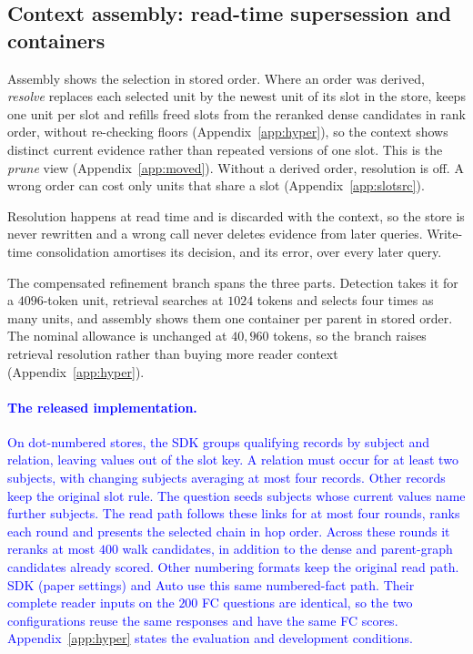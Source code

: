 \documentclass{article}
\newcommand{\nativechange}[1]{\textcolor{blue}{#1}}
\begin{document}
\subsection{Context assembly: read-time supersession and containers}\label{sec:resolve}

Assembly shows the selection in stored order. Where an order was derived, \emph{resolve} replaces each selected unit by the newest unit of its slot in the store, keeps one unit per slot and refills freed slots from the reranked dense candidates in rank order, without re-checking floors (Appendix~\ref{app:hyper}), so the context shows distinct current evidence rather than repeated versions of one slot. This is the \emph{prune} view (Appendix~\ref{app:moved}). Without a derived order, resolution is off. A wrong order can cost only units that share a slot (Appendix~\ref{app:slotsrc}).

Resolution happens at read time and is discarded with the context, so the store is never rewritten and a
wrong call never deletes evidence from later queries. Write-time consolidation amortises its decision, and
its error, over every later query.

The compensated refinement branch spans the three parts. Detection takes it for a $4096$-token unit, retrieval searches at $1024$ tokens and selects four times as many units, and assembly shows them one container per parent in stored order. The nominal allowance is unchanged at $40{,}960$ tokens, so the branch raises retrieval resolution rather than buying more reader context (Appendix~\ref{app:hyper}).

\paragraph{\nativechange{The released implementation.}} \nativechange{On dot-numbered stores, the SDK groups qualifying records by subject and relation, leaving values out of the slot key. A relation must occur for at least two subjects, with changing subjects averaging at most four records. Other records keep the original slot rule. The question seeds subjects whose current values name further subjects. The read path follows these links for at most four rounds, ranks each round and presents the selected chain in hop order. Across these rounds it reranks at most $400$ walk candidates, in addition to the dense and parent-graph candidates already scored. Other numbering formats keep the original read path. SDK (paper settings) and Auto use this same numbered-fact path. Their complete reader inputs on the $200$ FC questions are identical, so the two configurations reuse the same responses and have the same FC scores. Appendix~\ref{app:hyper} states the evaluation and development conditions.}
\end{document}
